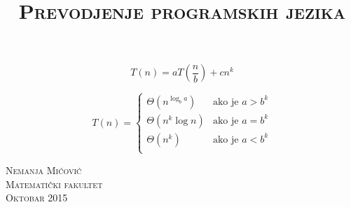 \documentclass{memoir}
\title{\huge{\textsc{Prevodjenje programskih jezika}\\ \normalsize{}}}
\date{}
\author{}
\begin{document}
\clearpage\maketitle
\thispagestyle{empty}
\vspace{10 mm}
\begin{center}
$$
T(n) = aT(\frac{n}{b}) + c n^k
$$

$$
T(n) =
  \begin{cases}
   \Theta(n ^{\log _b a})  & \text{ako je } a > b^k \\
   \Theta(n^k \log n)    & \text{ako je } a = b^k \\
   \Theta(n^k)			 & \text{ako je } a < b^k \\
  \end{cases}
$$
\end{center}

\vspace{40 mm}
\begin{center}
 \textsc{\LARGE{Nemanja Mićović\\}} 
 \vspace{10 mm}
 \textsc{Matematički fakultet} \\
 \textsc{Oktobar 2015}
\end{center}



\newpage
\setcounter{page}{1}
\renewcommand\chaptername{Poglavlje}	%
\renewcommand\contentsname{Sadržaj}	%
\renewcommand\partname{Deo}
\renewcommand{\bibname}{Bibliografija}
\renewcommand{\abstractname}{Zdravo svete!}


\end{document}
